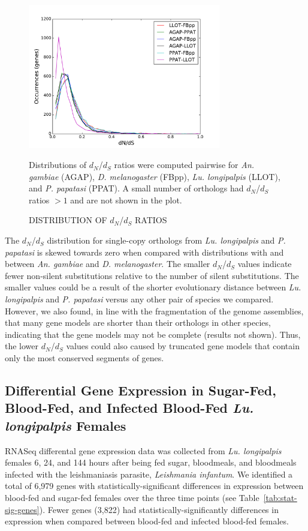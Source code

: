 \begin{figure}[H]
  \centering
  \caption{DISTRIBUTION OF $d_N$/$d_S$ RATIOS}
  \includegraphics[width=0.75\textwidth]{figures/ka_ks/dN_dS}
  \label{fig:dnds-distr}

  Distributions of $d_N$/$d_S$ ratios were computed pairwise for \emph{An. gambiae} (AGAP), \emph{D. melanogaster} (FBpp), \emph{Lu. longipalpis} (LLOT), and \emph{P. papatasi} (PPAT). A small number of orthologs had $d_N$/$d_S$ ratios $>1$ and are not shown in the plot.
\end{figure}


The $d_N$/$d_S$ distribution for single-copy orthologs from \emph{Lu. longipalpis} and \emph{P. papatasi} is skewed towards zero when compared with distributions with and between \emph{An. gambiae} and \emph{D. melanogaster}.  The smaller $d_N$/$d_S$ values indicate fewer non-silent substitutions relative to the number of silent substitutions.  The smaller values could be a result of the shorter evolutionary distance between \emph{Lu. longipalpis} and \emph{P. papatasi} versus any other pair of species we compared.  However, we also found, in line with the fragmentation of the genome assemblies, that many gene models are shorter than their orthologs in other species, indicating that the gene models may not be complete (results not shown).  Thus, the lower $d_N$/$d_S$ values could also caused by truncated gene models that contain only the most conserved segments of genes.

\subsection{Differential Gene Expression in Sugar-Fed, Blood-Fed, and Infected Blood-Fed \emph{Lu. longipalpis} Females}
RNASeq differental gene expression data was collected from \emph{Lu. longipalpis} females 6, 24, and 144 hours after being fed sugar, bloodmeals, and bloodmeals infected with the leishmaniasis parasite, \emph{Leishmania infantum}.  We identified a total of 6,979 genes with statistically-significant differences in expression between blood-fed and sugar-fed females over the three time points (see Table~\ref{tab:stat-sig-genes}).  Fewer genes (3,822) had statistically-significantly differences in expression when compared between blood-fed and infected blood-fed females.

